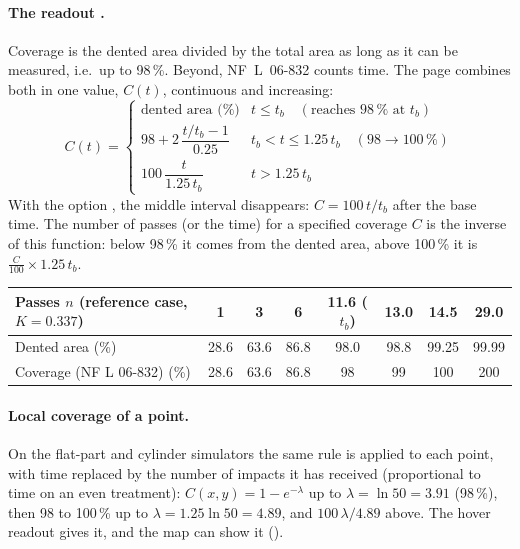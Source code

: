 \paragraph{The readout .} Coverage is the dented area divided by the total area as long as it can be measured, i.e.\ up to 98\,\%. Beyond, NF~L~06-832 counts time. The page combines both in one value, $C(t)$, continuous and increasing:
\begin{equation}
C(t)=\begin{cases}
\text{dented area (\%)} & t\le t_b\quad(\text{reaches }98\,\%\text{ at }t_b)\\[2pt]
98+2\,\dfrac{t/t_b-1}{0.25} & t_b<t\le1.25\,t_b\quad(98\to100\,\%)\\[6pt]
100\,\dfrac{t}{1.25\,t_b} & t>1.25\,t_b
\end{cases}
\end{equation}
With the option , the middle interval disappears: $C=100\,t/t_b$ after the base time. The number of passes (or the time) for a specified coverage $C$ is the inverse of this function: below 98\,\% it comes from the dented area, above 100\,\% it is $\frac{C}{100}\times1.25\,t_b$.

\begin{center}\small
\begin{tabular}{@{}lccccccc@{}}
\toprule
Passes $n$ (reference case, $K=0.337$) & 1 & 3 & 6 & 11.6 ($t_b$) & 13.0 & 14.5 & 29.0\\ \midrule
Dented area (\%) & 28.6 & 63.6 & 86.8 & 98.0 & 98.8 & 99.25 & 99.99\\
Coverage (NF L 06-832) (\%) & 28.6 & 63.6 & 86.8 & 98 & 99 & 100 & 200\\ \bottomrule
\end{tabular}
\end{center}

\paragraph{Local coverage of a point.} On the flat-part and cylinder simulators the same rule is applied to each point, with time replaced by the number of impacts it has received (proportional to time on an even treatment): $C(x,y)=1-e^{-\lambda}$ up to $\lambda=\ln50=3.91$ (98\,\%), then 98 to 100\,\% up to $\lambda=1.25\ln50=4.89$, and $100\,\lambda/4.89$ above. The hover readout gives it, and the map can show it ().

